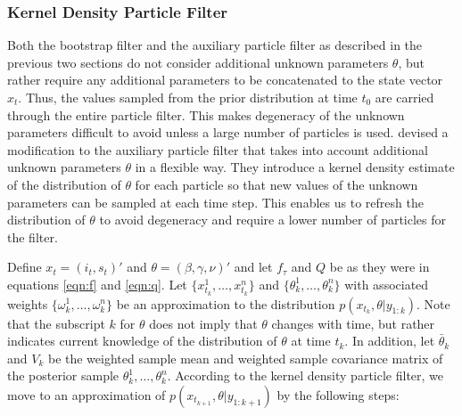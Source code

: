 \documentclass{article}
\begin{document}
\subsubsection{Kernel Density Particle Filter}

Both the bootstrap filter and the auxiliary particle filter as described in the previous two sections do not consider additional unknown parameters $\theta$, but rather require any additional parameters to be concatenated to the state vector $x_t$.  Thus, the values sampled from the prior distribution at time $t_0$ are carried through the entire particle filter.  This makes degeneracy of the unknown parameters difficult to avoid unless a large number of particles is used.  \citet{liu} devised a modification to the auxiliary particle filter that takes into account additional unknown parameters $\theta$ in a flexible way.  They introduce a kernel density estimate of the distribution of $\theta$ for each particle so that new values of the unknown parameters can be sampled at each time step.  This enables us to refresh the distribution of $\theta$ to avoid degeneracy and require a lower number of particles for the filter.

Define $x_t = (i_t,s_t)'$ and $\theta = (\beta,\gamma,\nu)'$ and let $f_\tau$ and $Q$ be as they were in equations \eqref{eqn:f} and \eqref{eqn:q}.  Let $\{x_{t_k}^1,\ldots,x_{t_k}^n\}$ and $\{\theta_k^1,\ldots,\theta_k^n\}$ with associated weights $\{\omega_k^1,\ldots,\omega_k^n\}$ be an approximation to the distribution $p(x_{t_k},\theta|y_{1:k})$.  Note that the subscript $k$ for $\theta$ does not imply that $\theta$ changes with time, but rather indicates current knowledge of the distribution of $\theta$ at time $t_k$.  In addition, let $\bar{\theta}_k$ and $V_k$ be the weighted sample mean and weighted sample covariance matrix of the posterior sample ${\theta_k^1,\ldots,\theta_k^n}$.  According to the kernel density particle filter, we move to an approximation of $p(x_{t_{k+1}},\theta|y_{1:{k+1}})$ by the following steps:
\end{document}

